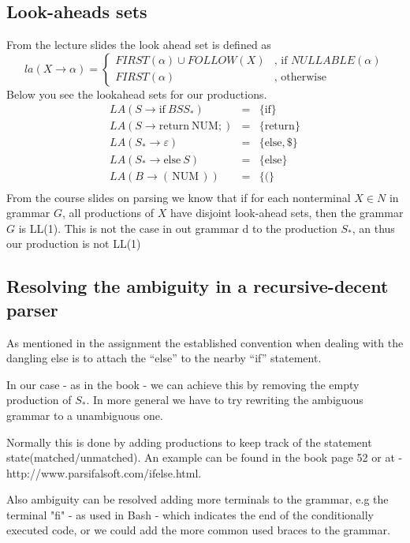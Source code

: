 \documentclass[11pt,a4paper]{article}
\begin{document}
\subsection{Look-aheads sets}
From the lecture slides the look ahead set is defined as
$$la(X\rightarrow\alpha)=
\begin{cases}
    FIRST(\alpha)\cup FOLLOW(X) & \textrm{, if }NULLABLE(\alpha)\\
    FIRST(\alpha)               & \textrm{, otherwise}
\end{cases}$$
Below you see the lookahead sets for our productions.
$$
\begin{array}{lcl}
    LA(S   \rightarrow  \mathrm{if\:}BSS_*)     & = &      \{\mathrm{if}\} \\
    LA(S   \rightarrow  \mathrm{return\:NUM;})  & = &      \{\mathrm{return}\} \\
    LA(S_* \rightarrow  \varepsilon)            & = &      \{\mathrm{else,} \$\} \\
    LA(S_* \rightarrow  \mathrm{else}\:S)       & = &      \{\mathrm{else}\} \\
    LA(B   \rightarrow  \mathrm{(\,NUM\,)})     & = &      \{\mathrm{(}\} \\
\end{array}
$$
From the course slides on parsing we know that if for each nonterminal $X
\in N$ in grammar $G$, all productions of $X$ have disjoint look-ahead sets,
then the grammar $G$ is LL(1). This is not the case in out grammar d to the
production $S_*$, an thus our production is not LL(1)
\subsection{Resolving the ambiguity in a recursive-decent parser}
As mentioned in the assignment the established convention when dealing with
the dangling else is to attach the ``else'' to the nearby ``if'' statement.

In our case - as in the book - we can achieve this by removing the empty
production of $S_*$. In more general we have to try rewriting the ambiguous
grammar to a unambiguous one.

Normally this is done by adding productions to keep track of the
statement state(matched/unmatched). An example can be found in the book page 52 or at -
http://www.parsifalsoft.com/ifelse.html.

Also ambiguity can be resolved adding more terminals to the grammar, e.g the
terminal "fi" - as used in Bash - which indicates the end of the conditionally
executed code, or we could add the more common used braces to the grammar.
\end{document}
